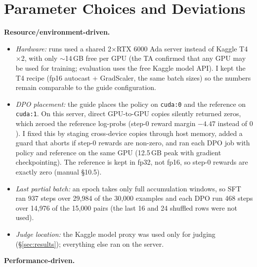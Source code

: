 \documentclass[10pt]{article}
\begin{document}
\section{Parameter Choices and Deviations}
\textbf{Resource/environment-driven.}
\begin{itemize}
\item \textit{Hardware:} runs used a shared 2$\times$RTX 6000 Ada server instead of Kaggle T4$\times$2, with only $\sim$14\,GB free per GPU (the TA confirmed that any GPU may be used for training; evaluation uses the free Kaggle model API). I kept the T4 recipe (fp16 autocast + GradScaler, the same batch sizes) so the numbers remain comparable to the guide configuration.
\item \textit{DPO placement:} the guide places the policy on \texttt{cuda:0} and the reference on \texttt{cuda:1}. On this server, direct GPU-to-GPU copies silently returned zeros, which zeroed the reference log-probs (step-0 reward margin $-4.47$ instead of $0$). I fixed this by staging cross-device copies through host memory, added a guard that aborts if step-0 rewards are non-zero, and ran each DPO job with policy and reference on the same GPU (12.5\,GB peak with gradient checkpointing). The reference is kept in fp32, not fp16, so step-0 rewards are exactly zero (manual \S10.5).
\item \textit{Last partial batch:} an epoch takes only full accumulation windows, so SFT ran 937 steps over 29{,}984 of the 30{,}000 examples and each DPO run 468 steps over 14{,}976 of the 15{,}000 pairs (the last 16 and 24 shuffled rows were not used).
\item \textit{Judge location:} the Kaggle model proxy was used only for judging (\S\ref{sec:results}); everything else ran on the server.
\end{itemize}
\textbf{Performance-driven.}
\end{document}
